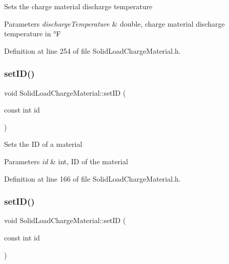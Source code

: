 Sets the charge material discharge temperature 
\begin{DoxyParams}{Parameters}
{\em discharge\+Temperature} & double, charge material discharge temperature in °F \\
\hline
\end{DoxyParams}


Definition at line 254 of file Solid\+Load\+Charge\+Material.\+h.

\mbox{\label{class_solid_load_charge_material_a4cc8e12ffb340c94106cecf576a85ae5}} 
\subsubsection{\texorpdfstring{set\+I\+D()}{setID()}\hspace{0.1cm}{\footnotesize\ttfamily [1/3]}}
{\footnotesize\ttfamily void Solid\+Load\+Charge\+Material\+::set\+ID (\begin{DoxyParamCaption}\item[{const int}]{id }\end{DoxyParamCaption})\hspace{0.3cm}{\ttfamily [inline]}}

Sets the ID of a material 
\begin{DoxyParams}{Parameters}
{\em id} & int, ID of the material \\
\hline
\end{DoxyParams}


Definition at line 166 of file Solid\+Load\+Charge\+Material.\+h.

\mbox{\label{class_solid_load_charge_material_a4cc8e12ffb340c94106cecf576a85ae5}} 
\subsubsection{\texorpdfstring{set\+I\+D()}{setID()}\hspace{0.1cm}{\footnotesize\ttfamily [2/3]}}
{\footnotesize\ttfamily void Solid\+Load\+Charge\+Material\+::set\+ID (\begin{DoxyParamCaption}\item[{const int}]{id }\end{DoxyParamCaption})\hspace{0.3cm}{\ttfamily [inline]}}

